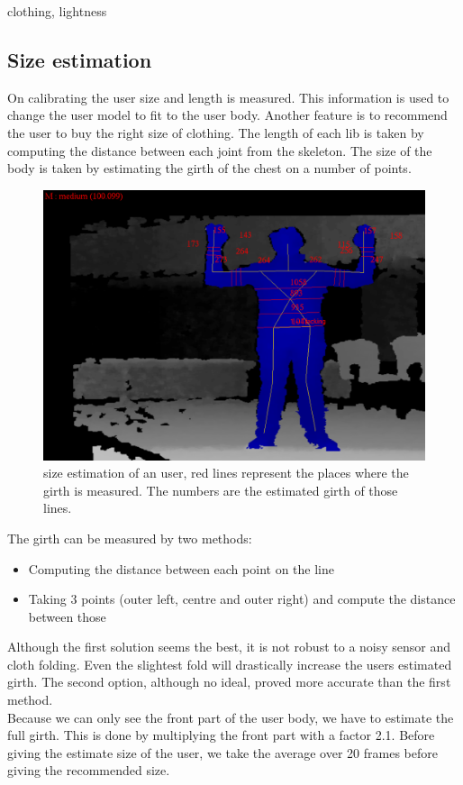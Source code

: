 \documentclass[a4paper]{article}
\begin{document}
clothing, lightness

\subsection{Size estimation}
On calibrating the user size and length is measured. This information is used to change the user model to fit to the user body. Another feature is to recommend the user to buy the right size of clothing. The length of each lib is taken by computing the distance between each joint from the skeleton.
The size of the body is taken by estimating the girth of the chest on a number of points.
\begin{figure}[htp]
\centering
\includegraphics[scale=0.3]{size_estimation.png} 
\caption{size estimation of an user, red lines represent the places where the girth is measured. The numbers are the estimated girth of those lines.}
\label{fig:size_estimation}
\end{figure}
The girth can be measured by two methods:
\begin{itemize}
\item Computing the distance between each point on the line
\item Taking 3 points (outer left, centre and outer right) and compute the distance between those
\end{itemize}
Although the first solution seems the best, it is not robust to a noisy sensor and cloth folding. Even the slightest fold will drastically increase the users estimated girth.
The second option, although no ideal, proved more accurate than the first method.
\\
Because we can only see the front part of the user body, we have to estimate the full girth. This is done by multiplying the front part with a factor 2.1.
Before giving the estimate size of the user, we take the average over 20 frames before giving the recommended size.
\end{document}
